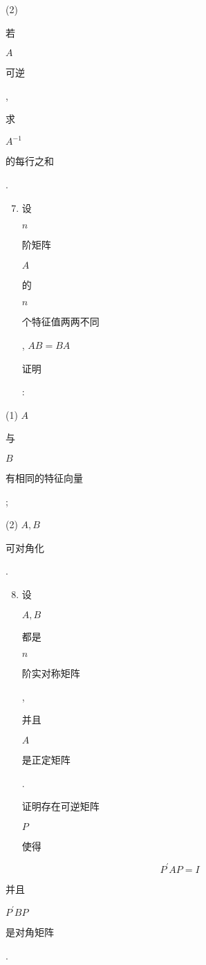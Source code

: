 \documentclass[10pt]{article}
\begin{document}
(2) \begin{CJK}{UTF8}{mj}若\end{CJK} $A$ \begin{CJK}{UTF8}{mj}可逆\end{CJK}, \begin{CJK}{UTF8}{mj}求\end{CJK} $A^{-1}$ \begin{CJK}{UTF8}{mj}的每行之和\end{CJK}.

\begin{enumerate}
  \setcounter{enumi}{6}
  \item \begin{CJK}{UTF8}{mj}设\end{CJK} $n$ \begin{CJK}{UTF8}{mj}阶矩阵\end{CJK} $A$ \begin{CJK}{UTF8}{mj}的\end{CJK} $n$ \begin{CJK}{UTF8}{mj}个特征值两两不同\end{CJK}, $A B=B A$ \begin{CJK}{UTF8}{mj}证明\end{CJK}:
\end{enumerate}
(1) $A$ \begin{CJK}{UTF8}{mj}与\end{CJK} $B$ \begin{CJK}{UTF8}{mj}有相同的特征向量\end{CJK};

(2) $A, B$ \begin{CJK}{UTF8}{mj}可对角化\end{CJK}.

\begin{enumerate}
  \setcounter{enumi}{7}
  \item \begin{CJK}{UTF8}{mj}设\end{CJK} $A, B$ \begin{CJK}{UTF8}{mj}都是\end{CJK} $n$ \begin{CJK}{UTF8}{mj}阶实对称矩阵\end{CJK}, \begin{CJK}{UTF8}{mj}并且\end{CJK} $A$ \begin{CJK}{UTF8}{mj}是正定矩阵\end{CJK}. \begin{CJK}{UTF8}{mj}证明存在可逆矩阵\end{CJK} $P$ \begin{CJK}{UTF8}{mj}使得\end{CJK}
\end{enumerate}
$$
P^{\prime} A P=I
$$
\begin{CJK}{UTF8}{mj}并且\end{CJK} $P^{\prime} B P$ \begin{CJK}{UTF8}{mj}是对角矩阵\end{CJK}.
\end{document}
